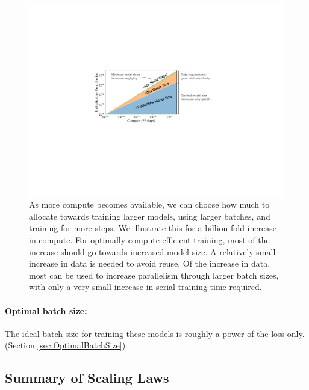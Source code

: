 \documentclass[english]{article}
\begin{document}
\begin{figure}
\noindent \centering{} \includegraphics[height=0.32\textwidth]{ContributionIllustration}
\caption[How to scale up model size, batch size, and serial steps]{As more compute becomes available, we can choose how much to allocate towards training larger models, using larger batches, and training for more steps.  We illustrate this for a billion-fold increase in compute.  For optimally compute-efficient training, most of the increase should go towards increased model size.  A relatively small increase in data is needed to avoid reuse.  Of the increase in data, most can be used to increase parallelism through larger batch sizes, with only a very small increase in serial training time required.  \label{fig:ContributionIllustration} }
\end{figure}

\paragraph{Optimal batch size:} The ideal batch size for training these models is roughly a power of the loss only. (Section \ref{sec:OptimalBatchSize})

\subsection{Summary of Scaling Laws}
\end{document}
